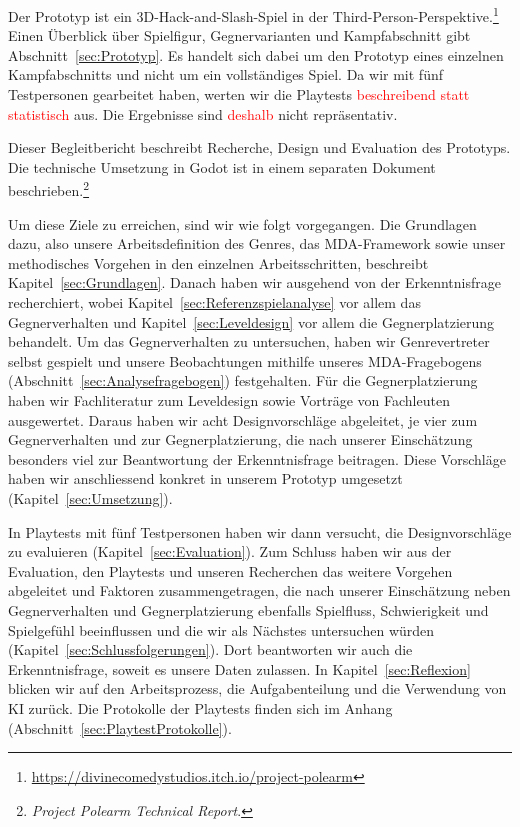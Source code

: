 \documentclass[../Main.tex]{subfiles}
\begin{document}
Der Prototyp ist ein 3D-Hack-and-Slash-Spiel in der Third-Person-Perspektive.\footnote{\url{https://divinecomedystudios.itch.io/project-polearm}} Einen Überblick über Spielfigur, Gegnervarianten und Kampfabschnitt gibt Abschnitt~\ref{sec:Prototyp}. Es handelt sich dabei um den Prototyp eines einzelnen Kampfabschnitts und nicht um ein vollständiges Spiel. Da wir mit fünf Testpersonen gearbeitet haben, werten wir die Playtests \textcolor{red}{beschreibend statt statistisch} aus. Die Ergebnisse sind \textcolor{red}{deshalb} nicht repräsentativ.

Dieser Begleitbericht beschreibt Recherche, Design und Evaluation des Prototyps. Die technische Umsetzung in Godot ist in einem separaten Dokument beschrieben.\footnote{\textit{Project Polearm Technical Report}.}

Um diese Ziele zu erreichen, sind wir wie folgt vorgegangen. Die Grundlagen dazu, also unsere Arbeitsdefinition des Genres, das MDA-Framework sowie unser methodisches Vorgehen in den einzelnen Arbeitsschritten, beschreibt Kapitel~\ref{sec:Grundlagen}. Danach haben wir ausgehend von der Erkenntnisfrage recherchiert, wobei Kapitel~\ref{sec:Referenzspielanalyse} vor allem das Gegnerverhalten und Kapitel~\ref{sec:Leveldesign} vor allem die Gegnerplatzierung behandelt. Um das Gegnerverhalten zu untersuchen, haben wir Genrevertreter selbst gespielt und unsere Beobachtungen mithilfe unseres MDA-Fragebogens (Abschnitt~\ref{sec:Analysefragebogen}) festgehalten. Für die Gegnerplatzierung haben wir Fachliteratur zum Leveldesign\autocite{totten2014architectural,rogers2014levelup} sowie Vorträge von Fachleuten\autocite{gdc_tenprinciples2010,gdc_movingmountains2020,gdc_horizonquests2018} ausgewertet. Daraus haben wir acht Designvorschläge abgeleitet, je vier zum Gegnerverhalten und zur Gegnerplatzierung, die nach unserer Einschätzung besonders viel zur Beantwortung der Erkenntnisfrage beitragen. Diese Vorschläge haben wir anschliessend konkret in unserem Prototyp umgesetzt (Kapitel~\ref{sec:Umsetzung}).

In Playtests mit fünf Testpersonen haben wir dann versucht, die Designvorschläge zu evaluieren (Kapitel~\ref{sec:Evaluation}). Zum Schluss haben wir aus der Evaluation, den Playtests und unseren Recherchen das weitere Vorgehen abgeleitet und Faktoren zusammengetragen, die nach unserer Einschätzung neben Gegnerverhalten und Gegnerplatzierung ebenfalls Spielfluss, Schwierigkeit und Spielgefühl beeinflussen und die wir als Nächstes untersuchen würden (Kapitel~\ref{sec:Schlussfolgerungen}). Dort beantworten wir auch die Erkenntnisfrage, soweit es unsere Daten zulassen. In Kapitel~\ref{sec:Reflexion} blicken wir auf den Arbeitsprozess, die Aufgabenteilung und die Verwendung von KI zurück. Die Protokolle der Playtests finden sich im Anhang (Abschnitt~\ref{sec:PlaytestProtokolle}).

\newpage
\end{document}
